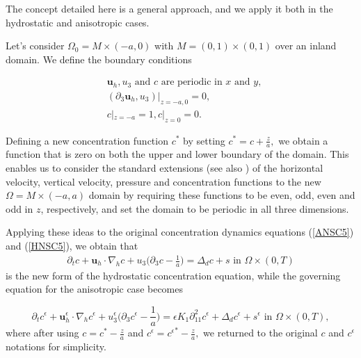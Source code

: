 \documentclass[11pt]{article}
\begin{document}
The concept detailed here is a general approach, and we apply it both in the hydrostatic and anisotropic cases.

Let's consider $\Omega_0 = M \times (-a, 0)$ with $M = (0,1) \times (0,1)$ over an inland domain. We define the boundary conditions

\begin{equation}
\begin{split}
& \mathbf{u}_h, u_3 \text{ and } c \text{ are periodic in } x \text{ and } y, \\
& (\partial_3 \mathbf{u}_h, u_3) | _{z = -a, 0} = 0, \\
& c |_{z = -a} = 1, c |_{z = 0} = 0.
\end{split}
\end{equation}

Defining a new concentration function $c^*$ by setting $c^* = c + \frac{z}{a},$ we obtain a function that is zero on both the upper and lower boundary of the domain. This enables us to consider the standard extensions (see also \cite{li2019primitive}) of the horizontal velocity, vertical velocity, pressure and concentration functions to the new $\Omega = M \times (-a, a)$ domain by requiring these functions to be even, odd, even and odd in $z$, respectively, and set the domain to be periodic in all three dimensions.

Applying these ideas to the original concentration dynamics equations (\ref{ANSC5}) and (\ref{HNSC5}), we obtain that
%
\begin{equation} \label{HNSC5_strong_cshift}
\begin{split}
\partial_t c + \mathbf{u}_h \cdot \nabla_h c + u_3 \bigg ( \partial_3 c - \frac{1}{a} \bigg ) = \Delta_d c + s \text{ in } \Omega \times (0,T)
\end{split}
\end{equation}
%
is the new form of the hydrostatic concentration equation, while the governing equation for the anisotropic case becomes

\begin{equation} \label{ANSC5_strong_cshift}
\partial_t c^\epsilon + \mathbf{u}_h^\epsilon \cdot \nabla_h c^\epsilon + u_3^\epsilon \bigg ( \partial_3 c^\epsilon - \frac{1}{a} \bigg )= \epsilon K_1 \partial_{11} ^ 2 c^\epsilon + \Delta_d c^\epsilon + s^\epsilon \text{ in } \Omega \times (0,T),
\end{equation}
%
where after using $c = c^* - \frac{z}{a}$ and $c^\epsilon = {c^\epsilon}^* - \frac{z}{a},$ we returned to the original $c$ and $c^\epsilon$ notations for simplicity.
\end{document}
